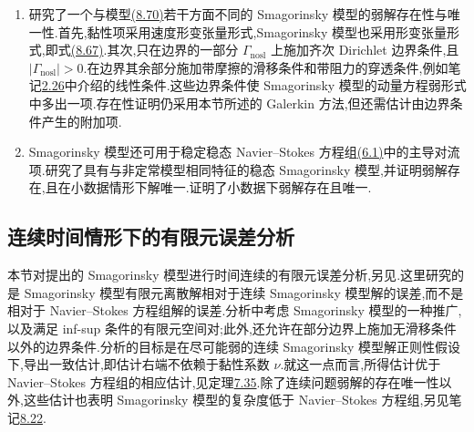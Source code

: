 \begin{note}
\label{note:smagorinsky-other-analytical-investigations}
\begin{enumerate}
 \item \textcite{Pares1992}研究了一个与模型\hyperref[eq:smagorinsky-momentum-balance]{(8.70)}若干方面不同的 Smagorinsky 模型的弱解存在性与唯一性.首先,黏性项采用速度形变张量形式,Smagorinsky 模型也采用形变张量形式,即式\hyperref[eq:smagorinsky-engineering-term]{(8.67)}.其次,只在边界的一部分 $\Gamma_{\mathrm{nosl}}$ 上施加齐次 Dirichlet 边界条件,且 $|\Gamma_{\mathrm{nosl}}|>0$.在边界其余部分施加带摩擦的滑移条件和带阻力的穿透条件,例如笔记\hyperref[note:slip-boundary-conditions]{2.26}中介绍的线性条件.这些边界条件使 Smagorinsky 模型的动量方程弱形式中多出一项.存在性证明仍采用本节所述的 Galerkin 方法,但还需估计由边界条件产生的附加项.
 \item Smagorinsky 模型还可用于稳定稳态 Navier--Stokes 方程组\hyperref[eq:steady-ns-strong]{(6.1)}中的主导对流项.\textcite{Pares1992}研究了具有与非定常模型相同特征的稳态 Smagorinsky 模型,并证明弱解存在,且在小数据情形下解唯一.\textcite{DuGunzburger1991}证明了小数据下弱解存在且唯一.
\end{enumerate}
\end{note}


\subsection{连续时间情形下的有限元误差分析}
\label{subsec:smagorinsky-error-analysis}

\begin{note}[本节内容]
\label{note:smagorinsky-error-analysis-contents}
本节对\textcite{JohnLayton2002}提出的 Smagorinsky 模型进行时间连续的有限元误差分析,另见\textcite[第 8.1 节]{John2004}.这里研究的是 Smagorinsky 模型有限元离散解相对于连续 Smagorinsky 模型解的误差,而不是相对于 Navier--Stokes 方程组解的误差.分析中考虑 Smagorinsky 模型的一种推广,以及满足 inf-sup 条件的有限元空间对;此外,还允许在部分边界上施加无滑移条件以外的边界条件.分析的目标是在尽可能弱的连续 Smagorinsky 模型解正则性假设下,导出一致估计,即估计右端不依赖于黏性系数 $\nu$.就这一点而言,所得估计优于 Navier--Stokes 方程组的相应估计,见定理\hyperref[thm:time-dependent-leray-hopf-existence]{7.35}.除了连续问题弱解的存在唯一性以外,这些估计也表明 Smagorinsky 模型的复杂度低于 Navier--Stokes 方程组,另见笔记\hyperref[note:smagorinsky-motivation]{8.22}.
\end{note}

